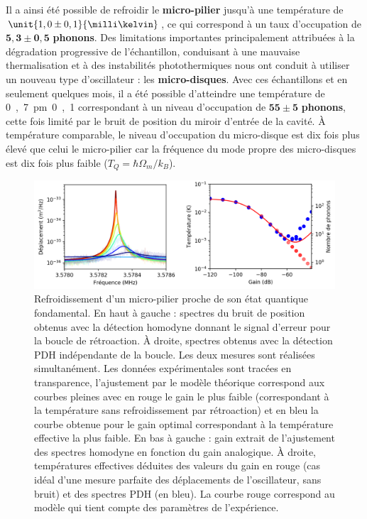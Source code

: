 \documentclass[12pt,a4paper]{article}
\begin{document}
Il a ainsi été possible de refroidir le \textbf{micro-pilier} jusqu'à une température de $\unit{1,0\pm 0,1}{\milli\kelvin}$, ce qui correspond à un taux d'occupation de $\mathbf{5,3 \pm 0,5}$ \textbf{phonons}.
Des limitations importantes principalement attribuées à la dégradation progressive de l'échantillon, conduisant à une mauvaise thermalisation et à des instabilités photothermiques nous ont conduit à utiliser un nouveau type d'oscillateur : les \textbf{micro-disques}.
Avec ces échantillons et en seulement quelques mois, il a été possible d'atteindre une température de \unit{0,7\pm 0,1}{\milli\kelvin} correspondant à un niveau d'occupation de $\mathbf{55\pm5}$ \textbf{phonons}, cette fois limité par le bruit de position du miroir d'entrée de la cavité.
À température comparable, le niveau d'occupation du micro-disque est dix fois plus élevé que celui le micro-pilier car la fréquence du mode propre des micro-disques est dix fois plus faible ($T_Q = \hbar\Omega_m/k_B$). 

\begin{figure}
\center
\includegraphics[scale=0.75]{figures/feedback_cooling_6phonons.png}
\caption{Refroidissement d'un micro-pilier proche de son état quantique fondamental.
En haut à gauche : spectres du bruit de position obtenus avec la détection homodyne donnant le signal d'erreur pour la boucle de rétroaction.
À droite, spectres obtenus avec la détection PDH indépendante de la boucle.
Les deux mesures sont réalisées simultanément.
Les données expérimentales sont tracées en transparence, l'ajustement par le modèle théorique correspond aux courbes pleines avec en rouge le gain le plus faible (correspondant à la température sans refroidissement par rétroaction) et en bleu la courbe obtenue pour le gain optimal correspondant à la température effective la plus faible.
En bas à gauche : gain extrait de l'ajustement des spectres homodyne en fonction du gain analogique.
À droite, températures effectives déduites des valeurs du gain en rouge (cas idéal d'une mesure parfaite des déplacements de l'oscillateur, sans bruit) et des spectres PDH (en bleu).
La courbe rouge correspond au modèle qui tient compte des paramètres de l'expérience.}
\label{fig:feedback_cooling_pillar}
\end{figure}
\end{document}

